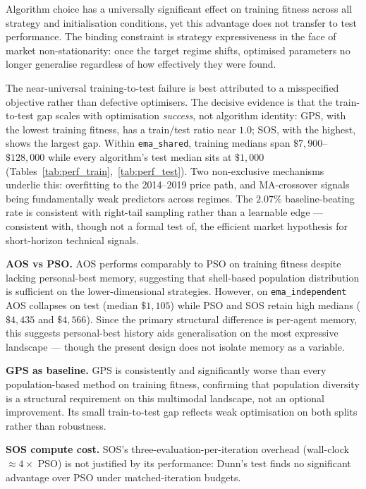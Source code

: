 \label{sec:conclusion}

Algorithm choice has a universally significant effect on training fitness
across all strategy and initialisation conditions, yet this advantage does
not transfer to test performance. The binding constraint is strategy
expressiveness in the face of market non-stationarity: once the target regime
shifts, optimised parameters no longer generalise regardless of how
effectively they were found.

The near-universal training-to-test failure is best attributed to a
misspecified objective rather than defective optimisers. The decisive
evidence is that the train-to-test gap scales with optimisation
\emph{success}, not algorithm identity: GPS, with the lowest training
fitness, has a train/test ratio near $1.0$; SOS, with the highest, shows the
largest gap. Within \texttt{ema\_shared}, training medians span
$\$7{,}900$--$\$128{,}000$ while every algorithm's test median sits at
$\$1{,}000$ (Tables~\ref{tab:perf_train},~\ref{tab:perf_test}). Two
non-exclusive mechanisms underlie this: overfitting to the 2014--2019 price
path, and MA-crossover signals being fundamentally weak predictors across
regimes. The $2.07\%$ baseline-beating rate is consistent with right-tail
sampling rather than a learnable edge --- consistent with, though not a
formal test of, the efficient market hypothesis for short-horizon technical
signals.

\textbf{AOS vs PSO.} AOS performs comparably to PSO on training fitness
despite lacking personal-best memory, suggesting that shell-based population
distribution is sufficient on the lower-dimensional strategies. However, on
\texttt{ema\_independent} AOS collapses on test (median $\$1{,}105$) while
PSO and SOS retain high medians ($\$4{,}435$ and $\$4{,}566$). Since the
primary structural difference is per-agent memory, this suggests personal-best
history aids generalisation on the most expressive landscape --- though the
present design does not isolate memory as a variable.

\textbf{GPS as baseline.} GPS is consistently and significantly worse than
every population-based method on training fitness, confirming that
population diversity is a structural requirement on this multimodal landscape,
not an optional improvement. Its small train-to-test gap reflects weak
optimisation on both splits rather than robustness.

\textbf{SOS compute cost.} SOS's three-evaluation-per-iteration overhead
(wall-clock $\approx 4\times$ PSO) is not justified by its performance: Dunn's
test finds no significant advantage over PSO under matched-iteration budgets.

